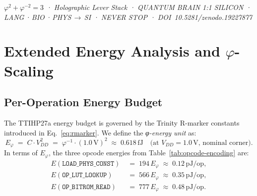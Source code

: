 \begin{center}
  \small\textit{%
    $\varphi^{2}+\varphi^{-2}=3$ \;·\;
    Holographic Lever Stack \;·\;
    QUANTUM BRAIN 1:1 SILICON \;·\;
    LANG\,·\,BIO\,·\,PHYS\,$\to$\,SI \;·\;
    NEVER STOP \;·\;
    DOI~10.5281/zenodo.19227877%
  }
\end{center}



\section{Extended Energy Analysis and \texorpdfstring{$\varphi$}{phi}-Scaling}
\label{sec:flos77-energy}

\subsection{Per-Operation Energy Budget}

The TTIHP27a energy budget is governed by the Trinity R-marker constants
introduced in Eq.~\eqref{eq:rmarker}.
We define the \emph{φ-energy unit} as:
%
\begin{equation}
  \label{eq:phi-energy-unit}
  E_\varphi \;=\; C \cdot V_{DD}^{2} \;=\; \varphi^{-1} \cdot (1.0\,\text{V})^{2}
  \;\approx\; 0.618\,\text{fJ}
  \quad \text{(at } V_{DD} = 1.0\,\text{V, nominal corner)}.
\end{equation}
%
In terms of $E_\varphi$, the three opcode energies from Table~\ref{tab:opcode-encoding} are:
%
\begin{align}
  E(\texttt{LOAD\_PHYS\_CONST}) &\;=\; 194\,E_\varphi
    \;\approx\; 0.12\,\text{pJ/op},
    \label{eq:e-phys} \\
  E(\texttt{OP\_LUT\_LOOKUP})   &\;=\; 566\,E_\varphi
    \;\approx\; 0.35\,\text{pJ/op},
    \label{eq:e-lut} \\
  E(\texttt{OP\_BITROM\_READ})  &\;=\; 777\,E_\varphi
    \;\approx\; 0.48\,\text{pJ/op}.
    \label{eq:e-bitrom}
\end{align}
%

